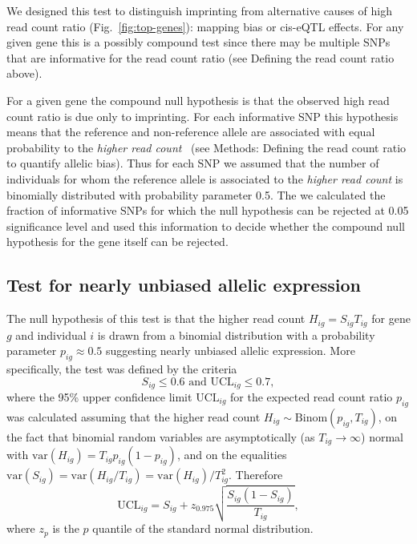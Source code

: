 \documentclass[letterpaper]{article}
\begin{document}
We designed this test to distinguish imprinting from alternative causes of
high read count ratio (Fig.~\ref{fig:top-genes}): mapping bias or cis-eQTL
effects.  For any given gene this is a possibly compound test since there may
be multiple SNPs that are informative for the read count ratio (see Defining
the read count ratio above).

For a given gene the compound null hypothesis is that the observed high read
count ratio is due only to imprinting.  For each informative SNP this
hypothesis means that the reference and non-reference allele are associated
with equal probability to the \emph{higher read count}~\cite{Babak2015} (see Methods: Defining
the read count ratio to quantify allelic bias).  Thus for each SNP we assumed
that the number of individuals for whom the reference allele is associated to
the \emph{higher read count} is binomially distributed with probability
parameter 0.5.  The we calculated the fraction of informative SNPs for which the
null hypothesis can be rejected at 0.05 significance level and used this
information to decide whether the compound null hypothesis for the gene itself
can be rejected.

\subsection{Test for nearly unbiased allelic expression}

The null hypothesis of this test is that the higher read count
\(H_{ig}=S_{ig}T_{ig}\) for gene \(g\) and individual \(i\) is drawn from a
binomial distribution with a probability parameter \(p_{ig}\approx 0.5\)
suggesting nearly unbiased allelic expression.  More specifically, the test
was defined by the criteria
\begin{equation}
S_{ig} \le 0.6 \text{ and } \mathrm{UCL}_{ig} \le 0.7,
\label{eq:unbiased-test}
\end{equation}
where the 95\% upper confidence limit \(\mathrm{UCL}_{ig}\) for the expected
read count ratio \(p_{ig}\) was calculated assuming that the higher read count
\(H_{ig}\sim \mathrm{Binom}(p_{ig}, T_{ig})\), on the fact that binomial
random variables are asymptotically (as \(T_{ig}\rightarrow \infty\)) normal
with \(\mathrm{var}(H_{ig}) = T_{ig}p_{ig}(1-p_{ig})\), and on the equalities
\(\mathrm{var}(S_{ig}) = \mathrm{var}(H_{ig}/T_{ig}) =
\mathrm{var}(H_{ig})/T_{ig}^2\).  Therefore
\begin{equation}
\mathrm{UCL}_{ig} = S_{ig} + z_{0.975} \sqrt{\frac{S_{ig} (1 - S_{ig})}{T_{ig}}},
\end{equation}
where $z_{p}$ is the $p$ quantile of the standard normal distribution.
\end{document}
